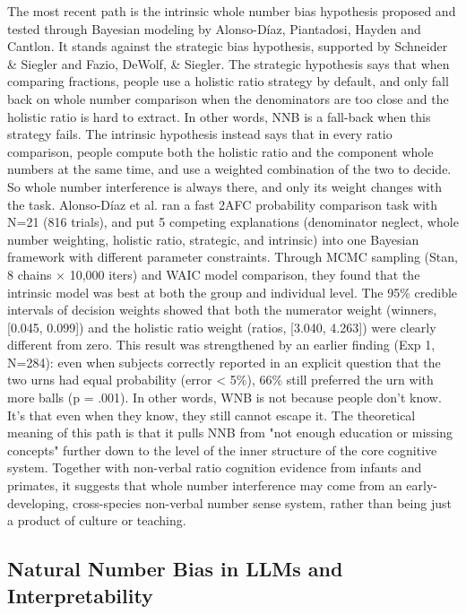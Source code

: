 The most recent path is the intrinsic whole number bias hypothesis proposed and tested through Bayesian modeling by Alonso-Díaz, Piantadosi, Hayden and Cantlon\cite{alonsodaz2018}. It stands against the strategic bias hypothesis, supported by Schneider \& Siegler\cite{schneider2010} and Fazio, DeWolf, \& Siegler\cite{fazio2016}. The strategic hypothesis says that when comparing fractions, people use a holistic ratio strategy by default, and only fall back on whole number comparison when the denominators are too close and the holistic ratio is hard to extract. In other words, NNB is a fall-back when this strategy fails. The intrinsic hypothesis instead says that in every ratio comparison, people compute both the holistic ratio and the component whole numbers at the same time, and use a weighted combination of the two to decide. So whole number interference is always there, and only its weight changes with the task. Alonso-Díaz et al.\cite{alonsodaz2018} ran a fast 2AFC probability comparison task with N=21 (816 trials), and put 5 competing explanations (denominator neglect, whole number weighting, holistic ratio, strategic, and intrinsic) into one Bayesian framework with different parameter constraints. Through MCMC sampling (Stan, 8 chains × 10,000 iters) and WAIC model comparison, they found that the intrinsic model was best at both the group and individual level. The 95\% credible intervals of decision weights showed that both the numerator weight (winners, [0.045, 0.099]) and the holistic ratio weight (ratios, [3.040, 4.263]) were clearly different from zero. This result was strengthened by an earlier finding (Exp 1, N=284): even when subjects correctly reported in an explicit question that the two urns had equal probability (error < 5\%), 66\% still preferred the urn with more balls (p = .001). In other words, WNB is not because people don't know. It's that even when they know, they still cannot escape it. The theoretical meaning of this path is that it pulls NNB from "not enough education or missing concepts" further down to the level of the inner structure of the core cognitive system. Together with non-verbal ratio cognition evidence from infants and primates\cite{denison2010, mccrink2007, rakoczy2014}, it suggests that whole number interference may come from an early-developing, cross-species non-verbal number sense system, rather than being just a product of culture or teaching.

\subsection{Natural Number Bias in LLMs and Interpretability}

